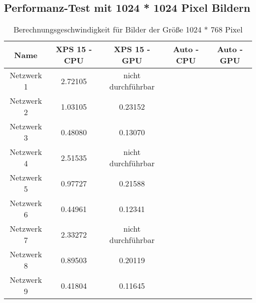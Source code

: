 \chapter{}

\section{Performanz-Test mit 1024 * 1024 Pixel Bildern}
\begin{table}[H]
    \centering
    \begin{tabular}{ |c|c|c|c|c| }
        \hline
        \textbf{Name} & \textbf{XPS 15 - CPU} & \textbf{XPS 15 - GPU} & \textbf{Auto - CPU} & \textbf{Auto - GPU}   \\ \hline
        Netzwerk 1 & 2.72105 & \textcolor{danger}{nicht durchführbar} & & \\ \hline
        Netzwerk 2 & 1.03105 & 0.23152                                & & \\ \hline
        Netzwerk 3 & 0.48080 & 0.13070                                & & \\ \hline
	
        Netzwerk 4 & 2.51535 & \textcolor{danger}{nicht durchführbar} & & \\ \hline
        Netzwerk 5 & 0.97727 & 0.21588                                & & \\ \hline
        Netzwerk 6 & 0.44961 & 0.12341                                & & \\ \hline

        Netzwerk 7 & 2.33272 & \textcolor{danger}{nicht durchführbar} & & \\ \hline
        Netzwerk 8 & 0.89503 & 0.20119                                & & \\ \hline
        Netzwerk 9 & 0.41804 & 0.11645                                & & \\ \hline
    \end{tabular}
    \caption{Berechnungsgeschwindigkeit für Bilder der Größe 1024 * 768 Pixel}
    \label{tab:1024x768}
\end{table}

